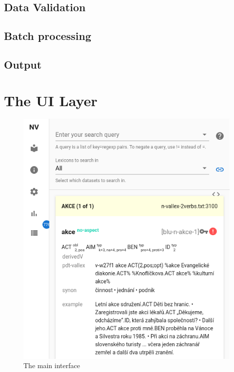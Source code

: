 \documentclass[10pt, a4paper, twocolumn]{article} %
\begin{document}
\subsection{Data Validation}
\subsection{Batch processing}
\subsection{Output}


\section{The UI Layer}

\begin{figure}
    \includegraphics[width=\hsize]{images/ui-main.png}
    \caption{The main interface}
\end{figure}
\end{document}
